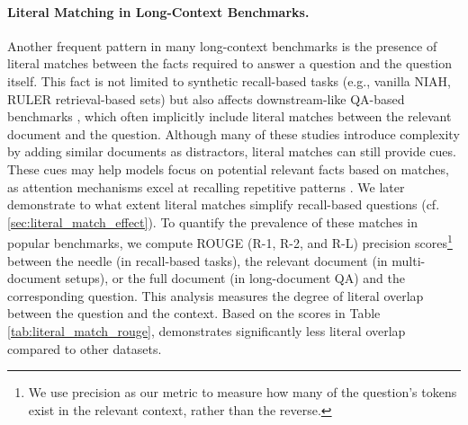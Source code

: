 \paragraph{Literal Matching in Long-Context Benchmarks.}
\label{sec:related_literal_matching}
Another frequent pattern in many long-context benchmarks is the presence of literal matches between the facts required to answer a question and the question itself. This fact is not limited to synthetic recall-based tasks (e.g., vanilla NIAH, RULER retrieval-based sets) but also affects downstream-like QA-based benchmarks \cite{hsieh2024ruler, liu-etal-2024-lost, zhang2024inftybenchextendinglongcontext, bai-etal-2024-longbench, yen2024helmet}, which often implicitly include literal matches between the relevant document and the question. Although many of these studies introduce complexity by adding similar documents as distractors, literal matches can still provide cues. These cues may help models focus on potential relevant facts based on matches, as attention mechanisms excel at recalling repetitive patterns \cite{olsson2022incontextlearninginductionheads, arora2024zoology}.
We later demonstrate to what extent literal matches simplify recall-based questions (cf. \ref{sec:literal_match_effect}). To quantify the prevalence of these matches in popular benchmarks, we compute ROUGE (R-1, R-2, and R-L) precision scores\footnote{We use precision as our metric to measure how many of the question's tokens exist in the relevant context, rather than the reverse.} \citep{lin-2004-rouge} between the needle (in recall-based tasks), the relevant document (in multi-document setups), or the full document (in long-document QA) and the corresponding question. This analysis measures the degree of literal overlap between the question and the context.
Based on the scores in Table \ref{tab:literal_match_rouge}, \framework demonstrates significantly less literal overlap compared to other datasets.